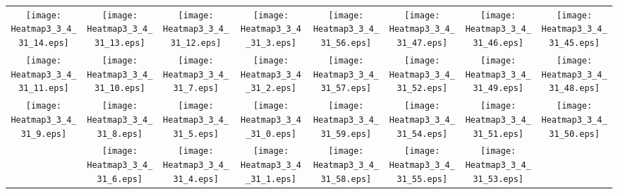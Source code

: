 \documentclass{standalone}
\begin{document}
\begin{tabular}{ *8{c} }
\texttt{[image: Heatmap3\_3\_4\_31\_14.eps]} & \texttt{[image: Heatmap3\_3\_4\_31\_13.eps]} & \texttt{[image: Heatmap3\_3\_4\_31\_12.eps]} & \texttt{[image: Heatmap3\_3\_4\_31\_3.eps]} & \texttt{[image: Heatmap3\_3\_4\_31\_56.eps]} & \texttt{[image: Heatmap3\_3\_4\_31\_47.eps]} & \texttt{[image: Heatmap3\_3\_4\_31\_46.eps]} & \texttt{[image: Heatmap3\_3\_4\_31\_45.eps]} \\
\texttt{[image: Heatmap3\_3\_4\_31\_11.eps]} & \texttt{[image: Heatmap3\_3\_4\_31\_10.eps]} & \texttt{[image: Heatmap3\_3\_4\_31\_7.eps]} & \texttt{[image: Heatmap3\_3\_4\_31\_2.eps]} & \texttt{[image: Heatmap3\_3\_4\_31\_57.eps]} & \texttt{[image: Heatmap3\_3\_4\_31\_52.eps]} & \texttt{[image: Heatmap3\_3\_4\_31\_49.eps]} & \texttt{[image: Heatmap3\_3\_4\_31\_48.eps]} \\
\texttt{[image: Heatmap3\_3\_4\_31\_9.eps]} & \texttt{[image: Heatmap3\_3\_4\_31\_8.eps]} & \texttt{[image: Heatmap3\_3\_4\_31\_5.eps]} & \texttt{[image: Heatmap3\_3\_4\_31\_0.eps]} & \texttt{[image: Heatmap3\_3\_4\_31\_59.eps]} & \texttt{[image: Heatmap3\_3\_4\_31\_54.eps]} & \texttt{[image: Heatmap3\_3\_4\_31\_51.eps]} & \texttt{[image: Heatmap3\_3\_4\_31\_50.eps]} \\
 & \texttt{[image: Heatmap3\_3\_4\_31\_6.eps]} & \texttt{[image: Heatmap3\_3\_4\_31\_4.eps]} & \texttt{[image: Heatmap3\_3\_4\_31\_1.eps]} & \texttt{[image: Heatmap3\_3\_4\_31\_58.eps]} & \texttt{[image: Heatmap3\_3\_4\_31\_55.eps]} & \texttt{[image: Heatmap3\_3\_4\_31\_53.eps]} &  
\end{tabular}
\end{document}
